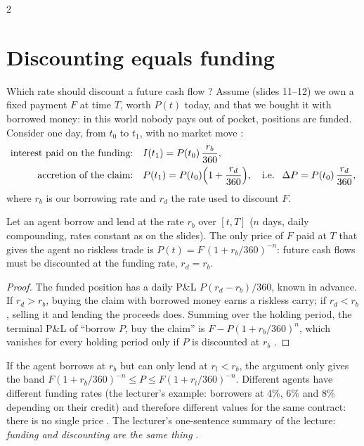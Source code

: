 \begin{paracol}{2}
\section{Discounting equals funding}\label{ch06:sec-funding}

Which rate should discount a future cash flow ? Assume (slides 11--12) we own a fixed payment
$F$ at time $T$, worth $P(t)$ today, and that we bought it with borrowed money: in this world nobody pays out
of pocket, positions are funded. Consider one day, from $t_0$ to $t_1$, with no market move
:
\begin{align*}
  \text{interest paid on the funding:}\quad & I(t_1) = P(t_0)\,\frac{r_b}{360},\\
  \text{accretion of the claim:}\quad & P(t_1) = P(t_0)\Bigl(1+\frac{r_d}{360}\Bigr),\quad\text{i.e. }\
  \Delta P = P(t_0)\,\frac{r_d}{360},
\end{align*}
where $r_b$ is our borrowing rate and $r_d$ the rate used to discount $F$.

\begin{proposition}[Discounting rate $=$ funding rate]\label{ch06:prop-funding}
Let an agent borrow and lend at the rate $r_b$ over $[t,T]$ ($n$ days, daily compounding, rates constant as on
the slides). The only price of $F$ paid at $T$ that gives the agent no riskless trade is
$P(t)=F\,(1+r_b/360)^{-n}$: future cash flows must be discounted at the funding rate, $r_d=r_b$.
\end{proposition}
\begin{proof}
The funded position has a daily P\&L $P(r_d-r_b)/360$, known in advance. If $r_d>r_b$, buying the claim with
borrowed money earns a riskless carry; if $r_d<r_b$, selling it and lending the proceeds does. Summing over the
holding period, the terminal P\&L of ``borrow $P$, buy the claim'' is $F-P(1+r_b/360)^n$, which vanishes for
every holding period only if $P$ is discounted at $r_b$ \ts{24}{7}{28:24}.
\end{proof}

\begin{remark}
If the agent borrows at $r_b$ but can only lend at $r_l<r_b$, the argument only gives the band
$F(1+r_b/360)^{-n}\le P\le F(1+r_l/360)^{-n}$. Different agents have different funding rates (the lecturer's
example: borrowers at 4\%, 6\% and 8\% depending on their credit) and therefore different values for the same
contract: there is no single price \ts{24}{7}{9:13}. The lecturer's one-sentence summary of the lecture:
\emph{funding and discounting are the same thing} \ts{24}{7}{28:24}.
\end{remark}


\end{paracol}
